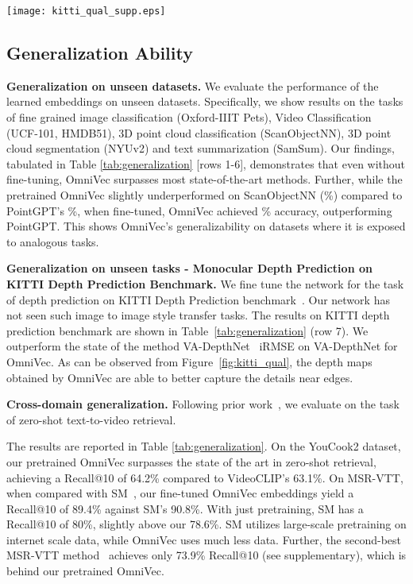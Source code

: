 \begin{figure*}[t]
    \centering
     \texttt{[image: kitti\_qual\_supp.eps]}
    \caption{Qualitative results on test set of KITTI Depth Prediction. Ground truth is not available. For an RGB input image (left), the outputs from VA-DepthNet~\cite{liu2023va}(middle) and OmniVec (right) are shown. See supplementary material for more qual.~results.}
    \label{fig:kitti_qual}
\end{figure*}

\subsection{Generalization Ability}



\noindent\textbf{Generalization on unseen datasets.} We evaluate the performance of the learned embeddings on unseen datasets. Specifically, we show results on the tasks of fine grained image classification (Oxford-IIIT Pets\cite{parkhi2012cats}), Video Classification (UCF-101\cite{soomro2012ucf101}, HMDB51\cite{kuehne2011hmdb}), 3D point cloud classification (ScanObjectNN\cite{uy2019revisiting}), 3D point cloud segmentation (NYUv2\cite{silberman2012indoor}) and text summarization (SamSum\cite{gliwa2019samsum}). Our findings, tabulated in Table \ref{tab:generalization} [rows 1-6], demonstrates that even without fine-tuning, OmniVec surpasses most state-of-the-art methods. Further, while the pretrained OmniVec slightly underperformed on ScanObjectNN (\%) compared to PointGPT's \%, when fine-tuned, OmniVec achieved \% accuracy, outperforming PointGPT. This shows OmniVec's generalizability on datasets where it is exposed to analogous tasks. 

\noindent\textbf{Generalization on unseen tasks - Monocular Depth Prediction on KITTI Depth Prediction Benchmark.} We fine tune the network for the task of depth prediction on KITTI Depth Prediction benchmark~\cite{Uhrig2017THREEDV}. Our network has not seen such image to image style transfer tasks. The results on KITTI depth prediction benchmark are shown in Table~\ref{tab:generalization} (row 7). We outperform the state of the method VA-DepthNet~\cite{liu2023va}  iRMSE on VA-DepthNet  for OmniVec. As can be observed from Figure~\ref{fig:kitti_qual}, the depth maps obtained by OmniVec are able to better capture the details near edges. 

\noindent\textbf{Cross-domain generalization.} Following prior work~\cite{akbari2021vatt}, we evaluate on the task of zero-shot text-to-video retrieval. 

The results are reported in Table \ref{tab:generalization}. On the YouCook2 dataset, our pretrained OmniVec surpasses the state of the art in zero-shot retrieval, achieving a Recall@10 of 64.2\% compared to VideoCLIP's 63.1\%. On MSR-VTT, when compared with SM~\cite{zeng2022socratic}, our fine-tuned OmniVec embeddings yield a Recall@10 of 89.4\% against SM's 90.8\%. With just pretraining, SM has a Recall@10 of 80\%, slightly above our 78.6\%. SM utilizes large-scale pretraining on internet scale data, while OmniVec uses much less data. Further, the second-best MSR-VTT method~\cite{chen2023vast} achieves only 73.9\% Recall@10 (see supplementary), which is behind our pretrained OmniVec.